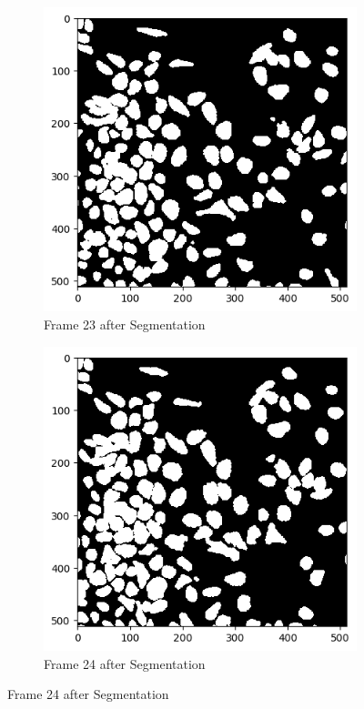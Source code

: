 \documentclass{article}
\begin{document}
\begin{figure}[h!]
  \begin{subfigure}{0.4\textwidth}
    \includegraphics[width=\linewidth]{Report/Appendix_Images/Segmentation-A-Control/frame_23.png}
    \caption*{Frame 23 after Segmentation}
  \end{subfigure}
  \hfill
  \begin{subfigure}{0.4\textwidth}
    \includegraphics[width=\linewidth]{Report/Appendix_Images/Segmentation-A-Control/frame_24.png}
    \caption*{Frame 24 after Segmentation}
  \end{subfigure}
\end{figure}
\end{document}
